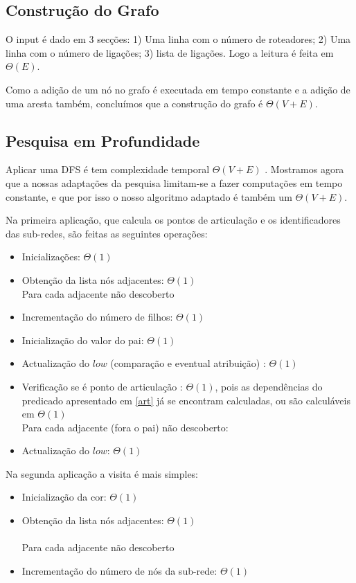 \documentclass[a4paper, 12pt, conference, portuguese]{ieeeconf}
\begin{document}
\subsection{Construção do Grafo}
O input é dado em $3$ secções: 1) Uma linha com o número de roteadores; 2) Uma
linha com o número de ligações; 3) lista de ligações. Logo a leitura é feita em
$\Theta(E)$.

Como a adição de um nó no grafo é executada em tempo constante e a adição de uma
aresta também, concluímos que a construção do grafo é $\Theta(V + E)$.

\subsection{Pesquisa em Profundidade}
Aplicar uma DFS é tem complexidade temporal $\Theta(V + E)$ \cite{cormen}.
Mostramos agora que a nossas adaptações da pesquisa limitam-se a fazer computações
em tempo constante, e que por isso o nosso algoritmo adaptado é também um $\Theta(V + E)$.

Na primeira aplicação, que calcula os pontos de articulação e os identificadores
das sub-redes, são feitas as seguintes operações:
\begin{itemize}
  \item Inicializações: $\Theta(1)$
  \item Obtenção da lista nós adjacentes: $\Theta(1)$\\

  Para cada adjacente não descoberto
  \item Incrementação do número de filhos: $\Theta(1)$
  \item Inicialização do valor do pai: $\Theta(1)$
  \item Actualização do $low$ (comparação e eventual atribuição) : $\Theta(1)$
  \item Verificação se é ponto de articulação : $\Theta(1)$, pois as
    dependências do predicado apresentado em \ref{art} já se encontram
    calculadas, ou são calculáveis em $\Theta(1)$ \\

  Para cada adjacente (fora o pai) não descoberto:
  \item Actualização do $low$: $\Theta(1)$
\end{itemize}

\newpage
Na segunda aplicação a visita é mais simples:
\begin{itemize}
  \item Inicialização da cor: $\Theta(1)$
  \item Obtenção da lista nós adjacentes: $\Theta(1)$\\ \\
  Para cada adjacente não descoberto
  \item Incrementação do número de nós da sub-rede: $\Theta(1)$
\end{itemize}
\end{document}
